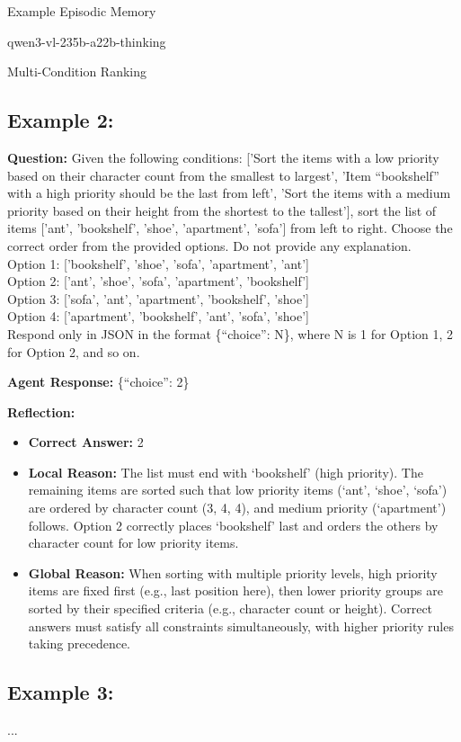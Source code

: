 \begin{promptbox}{Example Episodic Memory

qwen3-vl-235b-a22b-thinking

Multi-Condition Ranking}
\subsection*{Example 2:}
\textbf{Question:} Given the following conditions: ['Sort the items with a low priority based on their character count from the smallest to largest', 'Item ``bookshelf'' with a high priority should be the last from left', 'Sort the items with a medium priority based on their height from the shortest to the tallest'], sort the list of items ['ant', 'bookshelf', 'shoe', 'apartment', 'sofa'] from left to right. Choose the correct order from the provided options. Do not provide any explanation.\\
Option 1: ['bookshelf', 'shoe', 'sofa', 'apartment', 'ant']\\
Option 2: ['ant', 'shoe', 'sofa', 'apartment', 'bookshelf']\\
Option 3: ['sofa', 'ant', 'apartment', 'bookshelf', 'shoe']\\
Option 4: ['apartment', 'bookshelf', 'ant', 'sofa', 'shoe']\\
Respond only in JSON in the format \{``choice'': N\}, where N is 1 for Option 1, 2 for Option 2, and so on.

\textbf{Agent Response:} \{``choice'': 2\}

\textbf{Reflection:}
\begin{itemize}
  \item \textbf{Correct Answer:} 2
  \item \textbf{Local Reason:} The list must end with `bookshelf' (high priority). The remaining items are sorted such that low priority items (`ant', `shoe', `sofa') are ordered by character count (3, 4, 4), and medium priority (`apartment') follows. Option 2 correctly places `bookshelf' last and orders the others by character count for low priority items.
  \item \textbf{Global Reason:} When sorting with multiple priority levels, high priority items are fixed first (e.g., last position here), then lower priority groups are sorted by their specified criteria (e.g., character count or height). Correct answers must satisfy all constraints simultaneously, with higher priority rules taking precedence.
\end{itemize}

\subsection*{Example 3:}
...

\end{promptbox}



